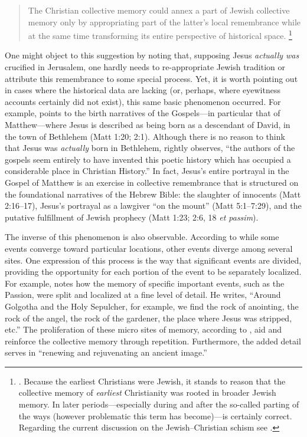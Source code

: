 \begin{quote}
    The Christian collective memory could annex a part of Jewish collective memory only by appropriating part of the latter's local remembrance while at the same time transforming its entire perspective of historical space.%
        \footnote{%
        \Cite[215]{halbwachs1992}.
        Because the earliest Christians were Jewish, it stands to reason that the collective memory of \emph{earliest} Christianity was rooted in broader Jewish memory. In later periods---especially during and after the so-called parting of the ways (however problematic this term has become)---\halbwachs is certainly correct. Regarding the current discussion on the Jewish--Christian schism see 
        \cite[19--60]{burns2016}.}
\end{quote}  
\noindent
One might object to this suggestion by noting that, supposing Jesus \emph{actually was} crucified in Jerusalem, one hardly needs to re-appropriate Jewish tradition or attribute this remembrance to some special process. Yet, it is worth pointing out in cases where the historical data are lacking (or, perhaps, where eyewitness accounts certainly did not exist), this same basic phenomenon occurred. For example, \halbwachs points to the birth narratives of the Gospels---in particular that of Matthew---where Jesus is described as being born as a descendant of David, in the town of Bethlehem (Matt 1:20; 2:1). Although there is no reason to think that Jesus was \emph{actually} born in Bethlehem, \halbwachs rightly observes, ``the authors of the gospels seem entirely to have invented this poetic history which has occupied a considerable place in Christian History.''%
    \autocite[214]{halbwachs1992}
In fact, Jesus's entire portrayal in the Gospel of Matthew is an exercise in collective remembrance that is structured on the foundational narratives of the Hebrew Bible: the slaughter of innocents (Matt 2:16--17), Jesus's portrayal as a lawgiver ``on the mount'' (Matt 5:1--7:29), and the putative fulfillment of Jewish prophecy (Matt 1:23; 2:6, 18 \emph{et passim}). 

The inverse of this phenomenon is also observable. According to \halbwachs while some events converge toward particular locations, other events diverge among several sites. One expression of this process is the way that significant events are divided, providing the opportunity for each portion of the event to be separately localized. For example, \halbwachs notes how the memory of specific important events, such as the Passion, were split and localized at a fine level of detail. He writes, ``Around Golgotha and the Holy Sepulcher, for example, we find the rock of anointing, the rock of the angel, the rock of the gardener, the place where Jesus was stripped, etc.''%
        \autocite[220]{halbwachs1992}
The proliferation of these micro sites of memory, according to \halbwachs, aid and reinforce the collective memory through repetition. Furthermore, the added detail serves in ``renewing and rejuvenating an ancient image.''%
    \autocite[220]{halbwachs1992}  

